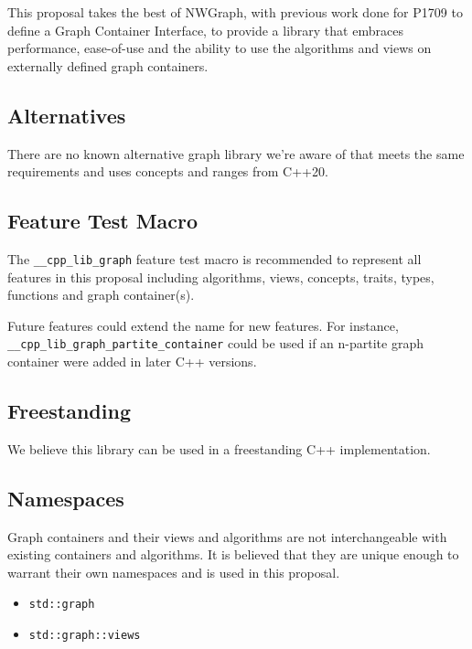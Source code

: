 \documentclass[10pt,onecolumn]{article}
\newcommand{\tcode}[1]{\lstinline[breaklines=true]{#1}}
\begin{document}
This proposal takes the best of NWGraph, with previous work done for P1709 to define a Graph Container Interface, to provide a library that
embraces performance, ease-of-use and the ability to use the algorithms and views on externally defined graph containers.

\subsection{Alternatives}
There are no known alternative graph library we're aware of that meets the same requirements and uses concepts and ranges from C++20.


\subsection{Feature Test Macro}
The \tcode{__cpp_lib_graph} feature test macro is recommended to represent all features in this proposal including algorithms, views, concepts, traits, types, functions and graph container(s).

Future features could extend the name for new features. For instance, \tcode{__cpp_lib_graph_partite_container} could be used if an n-partite graph container were added in later C++ versions.

\subsection{Freestanding}
We believe this library can be used in a freestanding C++ implementation.

\subsection{Namespaces}
Graph containers and their views and algorithms are not interchangeable with existing containers and algorithms.
It is believed that they are unique enough to warrant their own namespaces and is used in this proposal.
\begin{itemize}
\item[]\tcode{std::graph}
\item[]\tcode{std::graph::views}
\end{itemize}
\end{document}
